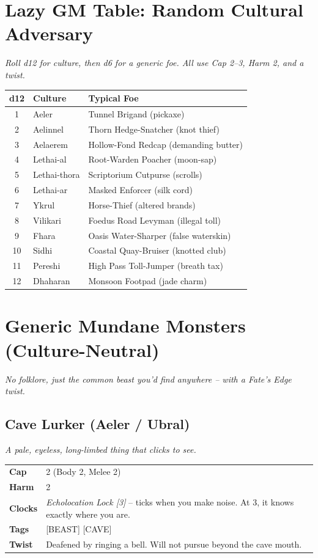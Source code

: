 \documentclass[10pt,twocolumn]{article}
\newcommand{\kw}[1]{\textbf{#1}}     %
\begin{document}
\section*{Lazy GM Table: Random Cultural Adversary}
\textit{Roll d12 for culture, then d6 for a generic foe. All use Cap 2--3, Harm 2, and a twist.}

\vspace{0.2in}
\begin{tabular}{@{}cll}
\toprule
d12 & \kw{Culture} & \kw{Typical Foe} \\
\midrule
1 & Aeler & Tunnel Brigand (pickaxe) \\
2 & Aelinnel & Thorn Hedge-Snatcher (knot thief) \\
3 & Aelaerem & Hollow-Fond Redcap (demanding butter) \\
4 & Lethai-al & Root-Warden Poacher (moon-sap) \\
5 & Lethai-thora & Scriptorium Cutpurse (scrolls) \\
6 & Lethai-ar & Masked Enforcer (silk cord) \\
7 & Ykrul & Horse-Thief (altered brands) \\
8 & Vilikari & Foedus Road Levyman (illegal toll) \\
9 & Fhara & Oasis Water-Sharper (false waterskin) \\
10 & Sidhi & Coastal Quay-Bruiser (knotted club) \\
11 & Pereshi & High Pass Toll-Jumper (breath tax) \\
12 & Dhaharan & Monsoon Footpad (jade charm) \\
\bottomrule
\end{tabular}

\section*{Generic Mundane Monsters (Culture-Neutral)}
\textit{No folklore, just the common beast you'd find anywhere -- with a Fate's Edge twist.}

\subsection*{Cave Lurker (Aeler / Ubral)}
\textit{A pale, eyeless, long-limbed thing that clicks to see.}
\begin{tabular}{@{}ll}
\toprule
\kw{Cap} & 2 (Body 2, Melee 2) \\
\kw{Harm} & 2 \\
\kw{Clocks} & \textit{Echolocation Lock [3]} -- ticks when you make noise. At 3, it knows exactly where you are. \\
\kw{Tags} & [BEAST] [CAVE] \\
\kw{Twist} & Deafened by ringing a bell. Will not pursue beyond the cave mouth. \\
\bottomrule
\end{tabular}
\end{document}
